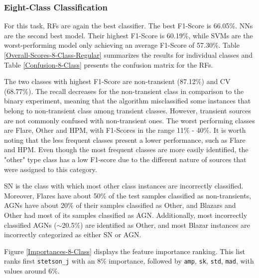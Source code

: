 \documentclass[usenatbib]{mnras}
\begin{document}
\subsubsection{Eight-Class Classification}

For this task, RFs are again the best classifier.  
The best F1-Score is 66.05\%. 
NNs are the second best model. 
Their highest F1-Score is 60.19\%, while SVMs are the worst-performing
model only achieving an average F1-Score of 57.30\%.
Table \ref{Overall-Scores-8-Class-Regular} summarizes the results for 
individual classes and Table \ref{Confusion-8-Class} presents 
the confusion matrix for the RFs.

The two classes with highest F1-Score are non-transient (87.12\%) and CV (68.77\%). 
The recall decreases for the non-transient class in comparison to the binary experiment, 
meaning that the algorithm misclassified some instances that belong to non-transient class
among transient classes. 
However, transient sources are not commonly confused with non-transient ones. 
The worst performing classes are Flare, Other and HPM, with F1-Scores in the 
range 11\% - 40\%. 
It is worth noting that the less frequent classes present a lower performance, 
such as Flare and HPM. 
Even though the most frequent classes are more easily identified, 
the "other" type class has a low F1-score due to the different nature 
of sources that were assigned to this category. 


SN is the class with which most other class instances are
incorrectly classified. 
Moreover, Flares have about 50\% of the test samples classified as
non-transients, AGNs have about 20\% of their 
samples classified as Other, and Blazars and Other had most of  its
samples classified as AGN. 
Additionally, most incorrectly classified AGNs ($\sim$20.5\%) are
identified as Other, and most Blazar instances are
incorrectly categorized as either SN or AGN. 


Figure \ref{Importances-8-Class} displays the feature importance ranking.
This list ranks first \texttt{stetson\_j} with an 8\% importance,
followed by \texttt{amp}, \texttt{sk}, \texttt{std}, \texttt{mad},
with values around 6\%.   
\end{document}
